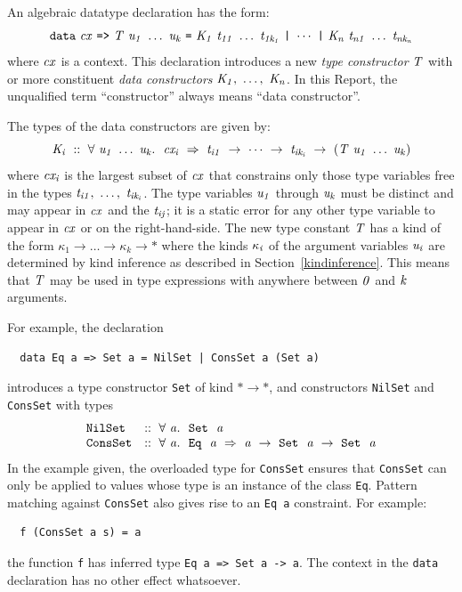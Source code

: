 An algebraic datatype declaration has the form:
\[
\mbox{$\it \makebox{\tt data}\ cx\ \makebox{\tt =>}\ T\ u_1\ \ldots \ u_k\ \makebox{\tt =}\ K_1\ t_{11}\ \ldots \ t_{1k_1}\ \makebox{\tt |}\ \cdots\ \makebox{\tt |}\ K_n\ t_{n1}\ \ldots \ t_{nk_n}$}
\]
where \mbox{$\it cx$} is a context.
This declaration
introduces a new {\em type constructor} \mbox{$\it T$} with  or more constituent {\em data
constructors} \mbox{$\it K_1,\ \ldots ,\ K_n$}.
In this Report, the unqualified term ``constructor'' always means ``data constructor''.

The types of the data constructors are given by:
\[
\mbox{$\it K_i\ ::\ \forall\ u_1\ \ldots \ u_k.~\ cx_i\ \Rightarrow\ t_{i1}\ \rightarrow\ \cdots\ \rightarrow\ t_{ik_i}\ \rightarrow\ (T\ u_1\ \ldots \ u_k)$}
\]
where \mbox{$\it cx_i$} is the largest subset of \mbox{$\it cx$} that constrains only those type
variables free in the types \mbox{$\it t_{i1},\ \ldots ,\ t_{ik_i}$}.
The type variables \mbox{$\it u_1$} through \mbox{$\it u_k$} must be distinct and may appear
in \mbox{$\it cx$} and the \mbox{$\it t_{ij}$}; it is a static error
for any other type variable to appear in \mbox{$\it cx$} or on the right-hand-side.
The new type constant \mbox{$\it T$} has a kind of the form
$\kappa_1\rightarrow\ldots\rightarrow\kappa_k\rightarrow\ast$
where the kinds \mbox{$\it \kappa_i$} of the argument variables \mbox{$\it u_i$} are
determined by kind inference
as described in Section~\ref{kindinference}.
This means that \mbox{$\it T$} may be used in type expressions with anywhere
between \mbox{$\it 0$} and \mbox{$\it k$} arguments.

For example, the declaration
\bprog
{\small\begin{verbatim}
  data Eq a => Set a = NilSet | ConsSet a (Set a)
\end{verbatim}}
\eprog
introduces a type constructor \mbox{\tt Set} of kind $\ast\rightarrow\ast$, and constructors \mbox{\tt NilSet} and
\mbox{\tt ConsSet} with types
\[\ba{ll}
\mbox{\tt NilSet}  & \mbox{$\it ::\ \forall\ a.~\ \makebox{\tt Set}~\ a$} \\
\mbox{\tt ConsSet} & \mbox{$\it ::\ \forall\ a.~\ \makebox{\tt Eq}~\ a\ \Rightarrow\ a\ \rightarrow\ \makebox{\tt Set}~\ a\ \rightarrow\ \makebox{\tt Set}~\ a$}
\ea\]
In the example given, the overloaded
type for \mbox{\tt ConsSet} ensures that \mbox{\tt ConsSet} can only be applied to values whose
type is an instance of the class \mbox{\tt Eq}.  
Pattern matching against \mbox{\tt ConsSet} also gives rise to an \mbox{\tt Eq\ a} constraint. 
For example: 
\bprog
{\small\begin{verbatim}
  f (ConsSet a s) = a
\end{verbatim}}
\eprog
the function \mbox{\tt f} has inferred type \mbox{\tt Eq\ a\ =>\ Set\ a\ ->\ a}.
The context in the \mbox{\tt data} declaration has no other effect whatsoever.

